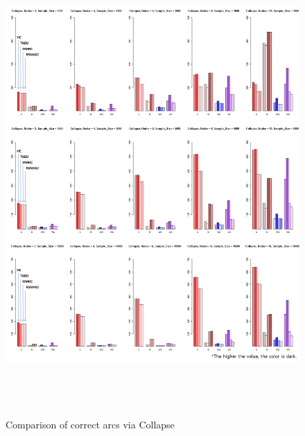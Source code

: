 	\begin{figure}[p]
	\centering
		\includegraphics[height=500pt]{images/01_Collapse_Arcs}
		\caption{Comparison of correct arcs via Collapse}
	\end{figure}	

\newpage{}

